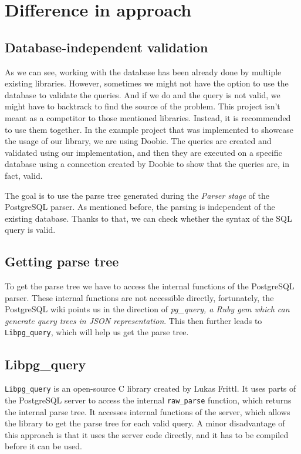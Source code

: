 \section{Difference in approach}
\subsection{Database-independent validation}
As we can see, working with the database has been already done by multiple existing libraries. However, sometimes we might not have the option to use the database to validate the queries. And if we do and the query is not valid, we might have to backtrack to find the source of the problem. This project isn't meant as a competitor to those mentioned libraries. Instead, it is recommended to use them together. In the example project that was implemented to showcase the usage of our library, we are using Doobie. The queries are created and validated using our implementation, and then they are executed on a specific database using a connection created by Doobie to show that the queries are, in fact, valid.

The goal is to use the parse tree generated during the \textit{Parser stage} of the PostgreSQL parser. As mentioned before, the parsing is independent of the existing database. Thanks to that, we can check whether the syntax of the SQL query is valid. 

\subsection{Getting parse tree}
To get the parse tree we have to access the internal functions of the PostgreSQL parser. These internal functions are not accessible directly, fortunately, the PostgreSQL\cite{Postgres wiki} wiki points us in the direction of \textit{pg\_query, a Ruby gem which can generate query trees in JSON representation}. This then further leads to \texttt{Libpg\_query}, which will help us get the parse tree.

\subsection{Libpg\_query}
\texttt{Libpg\_query} is an open-source C library created by Lukas Frittl. It uses parts of the PostgreSQL server to access the internal \texttt{raw\_parse} function, which returns the internal parse tree. It accesses internal functions of the server, which allows the library to get the parse tree for each valid query. A minor disadvantage of this approach is that it uses the server code directly, and it has to be compiled before it can be used.


